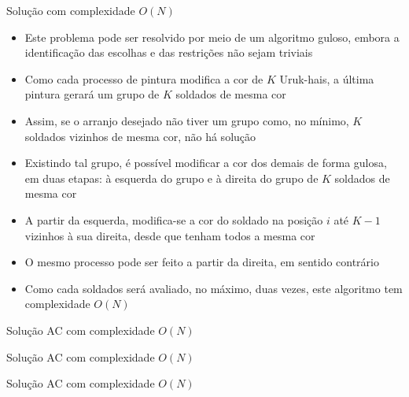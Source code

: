 \begin{frame}[fragile]{Solução com complexidade $O(N)$}

    \begin{itemize}
        \item Este problema pode ser resolvido por meio de um algoritmo guloso, embora a
            identificação das escolhas e das restrições não sejam triviais

        \item Como cada processo de pintura modifica a cor de $K$ Uruk-hais, a última pintura
            gerará um grupo de $K$ soldados de mesma cor

        \item Assim, se o arranjo desejado não tiver um grupo como, no mínimo, $K$ soldados
            vizinhos de mesma cor, não há solução

        \item Existindo tal grupo, é possível modificar a cor dos demais de forma gulosa,
            em duas etapas: à esquerda do grupo e à direita do grupo de $K$ soldados de mesma cor

        \item A partir da esquerda, modifica-se a cor do soldado na posição $i$ até $K - 1$ 
            vizinhos à sua direita, desde que tenham todos a mesma cor

        \item O mesmo processo pode ser feito a partir da direita, em sentido contrário

        \item Como cada soldados será avaliado, no máximo, duas vezes, este algoritmo tem
            complexidade $O(N)$
   \end{itemize}

\end{frame}

\begin{frame}[fragile]{Solução AC com complexidade $O(N)$}
\end{frame}

\begin{frame}[fragile]{Solução AC com complexidade $O(N)$}
\end{frame}

\begin{frame}[fragile]{Solução AC com complexidade $O(N)$}
\end{frame}




